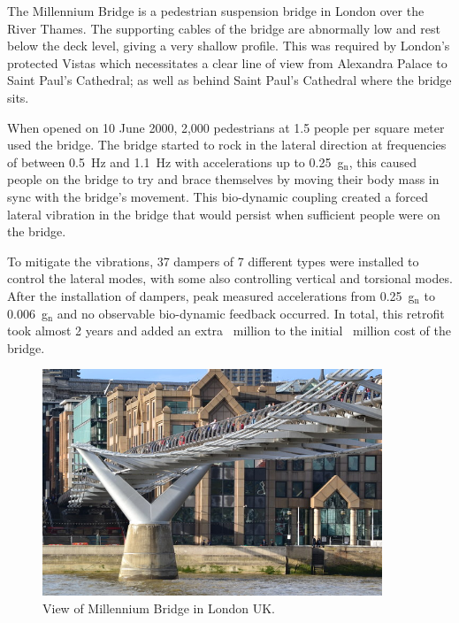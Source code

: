\documentclass[12pt,letter]{article}
\numberwithin{ex}{section} %
\numberwithin{re}{section} %
\newtheorem{vcs}{Vibration Case Study}
\numberwithin{vcs}{section} %
\newenvironment{vibration_case_study}{\begin{mdframed}[linecolor=orange,middlelinewidth=2mm,roundcorner=20pt]\begin{vcs}\normalfont}{\end{vcs}\end{mdframed}}
\begin{document}
		\begin{vibration_case_study}
			The Millennium Bridge is a pedestrian suspension bridge in London over the River Thames. The supporting cables of the bridge are abnormally low and rest below the deck level, giving a very shallow profile. This was required by London's protected Vistas which necessitates a clear line of view from Alexandra Palace to Saint Paul's Cathedral; as well as behind Saint Paul's Cathedral where the bridge sits. 

			When opened on 10 June 2000, 2,000 pedestrians at  1.5 people per square meter used the bridge. The bridge started to rock in the lateral direction at frequencies of between 0.5~Hz and 1.1~Hz with accelerations up to 0.25~g$_\text{n}$, this caused people on the bridge to try and brace themselves by moving their body mass in sync with the bridge's movement. This bio-dynamic coupling created a forced lateral vibration in the bridge that would persist when sufficient people were on the bridge.   

			To mitigate the vibrations, 37 dampers of 7 different types were installed to control the lateral modes, with some also controlling vertical and torsional modes. After the installation of dampers, peak measured accelerations from 0.25~g$_\text{n}$ to 0.006~g$_\text{n}$ and no observable bio-dynamic feedback occurred. In total, this retrofit took almost 2 years and added an extra ~million to the initial ~million cost of the bridge.
			
			\begin{figure}[H]
				\centering
				\includegraphics[width=4in]{../figures/Under_the_Millennium_Bridge}
				\caption{View of Millennium Bridge in London UK\protect\footnotemark[1].}
			\end{figure}
		\end{vibration_case_study}
\end{document}
